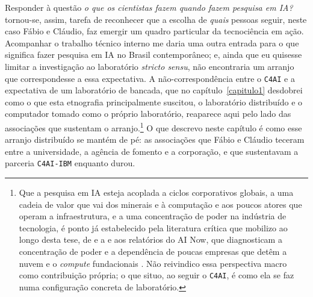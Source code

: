 Responder à questão \textit{o que os cientistas fazem quando fazem pesquisa em IA?} tornou-se, assim, tarefa de reconhecer que a escolha de \textit{quais} pessoas seguir, neste caso Fábio e Cláudio, faz emergir um quadro particular da tecnociência em ação. Acompanhar o trabalho técnico interno me daria uma outra entrada para o que significa fazer pesquisa em IA no Brasil contemporâneo; e, ainda que eu quisesse limitar a investigação ao laboratório \textit{stricto sensu}, não encontraria um arranjo que correspondesse a essa expectativa. A não-correspondência entre o \texttt{C4AI} e a expectativa de um laboratório de bancada, que no capítulo~\ref{capitulo1} desdobrei como o que esta etnografia principalmente suscitou, o laboratório distribuído e o computador tomado como o próprio laboratório, reaparece aqui pelo lado das associações que sustentam o arranjo.\footnote{Que a pesquisa em IA esteja acoplada a ciclos corporativos globais, a uma cadeia de valor que vai dos minerais e à computação e aos poucos atores que operam a infraestrutura, e a uma concentração de poder na indústria de tecnologia, é ponto já estabelecido pela literatura crítica que mobilizo ao longo desta tese, de \textcite{Crawford2018Anatomy} e \textcite{Crawford2021Atlas} a \textcite{pasquinelli2020nooscope} e aos relatórios do AI Now, que diagnosticam a concentração de poder e a dependência de poucas empresas que detêm a nuvem e o \textit{compute} fundacionais \parencite{Brennan2025ArtificialPower}. Não reivindico essa perspectiva macro como contribuição própria; o que situo, ao seguir o \texttt{C4AI}, é como ela se faz numa configuração concreta de laboratório.} O que descrevo neste capítulo é como esse arranjo distribuído se mantém de pé: as associações que Fábio e Cláudio teceram entre a universidade, a agência de fomento e a corporação, e que sustentavam a parceria \texttt{C4AI-IBM} enquanto durou.

